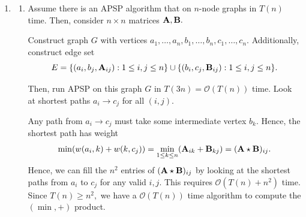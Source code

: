 \documentclass[12pt]{article}
\begin{document}
\begin{enumerate}
\begin{enumerate}
      \item Let us assume the OV conjecture is true. Then, there is
        no algorithm for the OV problem with time complexity
        $$
        \mathcal O(n^{2 - \epsilon} \text{poly}(d))
        $$
        for any $\epsilon > 0.$
        However, we can solve OV in $\mathcal O(T(nd, nd) + nd)$
        time, meaning $$
        \mathcal O(T(nd, nd) + nd) = \Omega(n^{2-\epsilon} \text{poly}(d))
        $$
        for any $\epsilon > 0,$ since otherwise the OV conjecture
        would be false.

        Look at the cases $0 < \epsilon < 1.$  Then, since $nd =
        O(n^{2-\epsilon}\text{poly}(d)),$ we need
        $$
        T(nd, nd) = \Omega(n^{2 - \epsilon}\text{poly}(d))
        $$
        for any $0 < \epsilon < 1.$ Thus, we cannot have $$
        T(n, m) = \mathcal O (n^{0.99}m)\ \lor \ T(n, m) = \mathcal
        O(nm^{0.99}),
        $$
        since then $T(nd, nd) =\mathcal O( n^{1.99}d^{1.99}) = o(n^{2
        - 0.01} \text{poly}(d)),$ which is a contradiction of the OV
        conjecture. I.e., OV conjecture reduces to regex.
    \end{enumerate}

  \item
    \begin{enumerate}
      \item Assume there is an APSP algorithm that on $n$-node graphs
        in $T(n)$ time. Then, consider $n \times n$ matrices $\mathbf{A}, \mathbf{B}.$

        Construct graph $G$ with vertices $a_1, \ldots, a_n, b_1,
        \ldots, b_n, c_1, \ldots, c_n.$ Additionally, construct edge set
        $$
        E =\{
          (a_i, b_j, \mathbf{A}_{ij}): 1 \leq i, j \leq n
        \}  \cup \{
          (b_i, c_j, \mathbf{B}_{ij}) : 1 \leq i, j \leq n
        \}.
        $$

        Then, run APSP on this graph $G$ in $T(3n) = \mathcal
        O(T(n))$ time. Look at shortest paths $a_i \to c_j$ for all $(i, j).$

        Any path from $a_i \to c_j$ must take some intermediate
        vertex $b_k.$ Hence, the shortest path has weight
        $$
        \min(w(a_i, k) + w(k, c_j)) = \min_{1 \leq k \leq n}(\mathbf{A}_{ik} + \mathbf{B}_{kj}) = (\mathbf{A} \star \mathbf{B})_{ij}.
        $$
        Hence, we can fill the $n^2$ entries of $(\mathbf{A} \star \mathbf{B})_{ij}$ by looking at the shortest paths from $a_i$ to $c_j$
        for any valid $i, j.$ This requires $\mathcal O(T(n) + n^2)$
        time. Since $T(n) \geq n^2,$ we have a $\mathcal O(T(n))$
        time algorithm to compute the $(\min, +)$ product.


\end{enumerate}
\end{enumerate}
\end{document}
